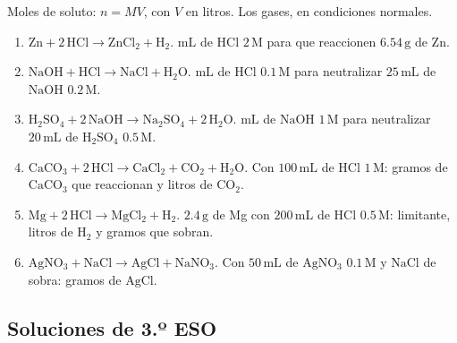 Moles de soluto: $n=MV$, con $V$ en litros.
Los gases, en condiciones normales.

\begin{enumerate}
    \item[a)] $\mathrm{Zn}+2\,\mathrm{HCl}\rightarrow
    \mathrm{ZnCl_2}+\mathrm{H_2}$.
    $\mathrm{mL}$ de $\mathrm{HCl}$ $2\,\mathrm{M}$
    para que reaccionen $6.54\,\mathrm{g}$ de Zn.

    \item[b)] $\mathrm{NaOH}+\mathrm{HCl}\rightarrow
    \mathrm{NaCl}+\mathrm{H_2O}$.
    $\mathrm{mL}$ de $\mathrm{HCl}$ $0.1\,\mathrm{M}$
    para neutralizar $25\,\mathrm{mL}$ de $\mathrm{NaOH}$ $0.2\,\mathrm{M}$.

    \item[c)] $\mathrm{H_2SO_4}+2\,\mathrm{NaOH}\rightarrow
    \mathrm{Na_2SO_4}+2\,\mathrm{H_2O}$.
    $\mathrm{mL}$ de $\mathrm{NaOH}$ $1\,\mathrm{M}$
    para neutralizar $20\,\mathrm{mL}$ de $\mathrm{H_2SO_4}$ $0.5\,\mathrm{M}$.

    \item[d)] $\mathrm{CaCO_3}+2\,\mathrm{HCl}\rightarrow
    \mathrm{CaCl_2}+\mathrm{CO_2}+\mathrm{H_2O}$.
    Con $100\,\mathrm{mL}$ de $\mathrm{HCl}$ $1\,\mathrm{M}$:
    gramos de $\mathrm{CaCO_3}$ que reaccionan y litros de $\mathrm{CO_2}$.

    \item[e)] $\mathrm{Mg}+2\,\mathrm{HCl}\rightarrow
    \mathrm{MgCl_2}+\mathrm{H_2}$.
    $2.4\,\mathrm{g}$ de Mg con $200\,\mathrm{mL}$ de $\mathrm{HCl}$
    $0.5\,\mathrm{M}$:
    limitante, litros de $\mathrm{H_2}$ y gramos que sobran.

    \item[f)] $\mathrm{AgNO_3}+\mathrm{NaCl}\rightarrow
    \mathrm{AgCl}+\mathrm{NaNO_3}$.
    Con $50\,\mathrm{mL}$ de $\mathrm{AgNO_3}$ $0.1\,\mathrm{M}$
    y $\mathrm{NaCl}$ de sobra: gramos de $\mathrm{AgCl}$.
\end{enumerate}

\subsection{Soluciones de 3.º ESO}

